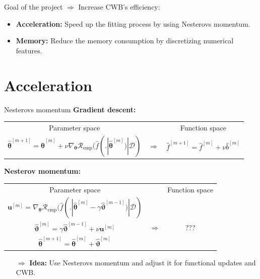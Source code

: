 \documentclass[ignorenonframetext,]{beamer}
\providecommand{\tightlist}{%
  \setlength{\itemsep}{0pt}\setlength{\parskip}{0pt}}
\newcommand{\D}{\mathcal{D}}
\newcommand{\fh}{\hat{f}}
\newcommand{\fmh}{\fh^{[m]}}
\newcommand{\tb}{\bm{\theta}}
\newcommand{\tbh}{\hat{\bm{\theta}}}
\newcommand{\riske}{\mathcal{R}_{\text{emp}}}
\begin{document}
\begin{frame}{Goal of the project}
\protect\hypertarget{goal-of-the-project}{}
\(\Rightarrow\) Increase CWB's efficiency:

\begin{itemize}
\tightlist
\item
  \textbf{Acceleration:} Speed up the fitting process by using Nesterovs
  momentum.
\item
  \textbf{Memory:} Reduce the memory consumption by discretizing
  numerical features.
\end{itemize}
\end{frame}

\hypertarget{acceleration}{%
\section{Acceleration}\label{acceleration}}

\begin{frame}{Nesterovs momentum}
\protect\hypertarget{nesterovs-momentum}{}
\textbf{Gradient descent:}

\vspace{0.2cm}
{\small
\begin{tabular}{ccc}
  Parameter space & & Function space \\[0.3cm]
  $\tbh^{[m+1]} = \tbh^{[m]} + \nu \nabla_{\tb}\riske(\fh(. | \tbh^{[m]}) | \D)$ & $\Rightarrow$ & $\fh^{[m+1]} = \fmh + \nu \hat{b}^{[m]}$
\end{tabular}}
\vspace{0.2cm}

\textbf{Nesterov momentum:}

\vspace{0.2cm}
{\small
\begin{tabular}{ccc}
  Parameter space & & Function space \\[0.3cm]
  $\bm{u}^{[m]} = \nabla_{\tb}\riske(\fh(. | \tbh^{[m]} - \gamma \hat{\bm{\vartheta}}^{[m-1]}) | \D)$ &  & \\
  $\hat{\bm{\vartheta}}^{[m]} = \gamma \hat{\bm{\vartheta}}^{[m-1]} + \nu \bm{u}^{[m]}$ & $\Rightarrow$ & ??? \\
  $\tbh^{[m+1]} = \tbh^{[m]} + \hat{\bm{\vartheta}}^{[m]}$ & &
\end{tabular}}
\vspace{0.2cm}

\begin{itemize}
\item[$\Rightarrow$] \textbf{Idea:} Use Nesterovs momentum and adjust it for functional updates and CWB.
\end{itemize}
\end{frame}
\end{document}
